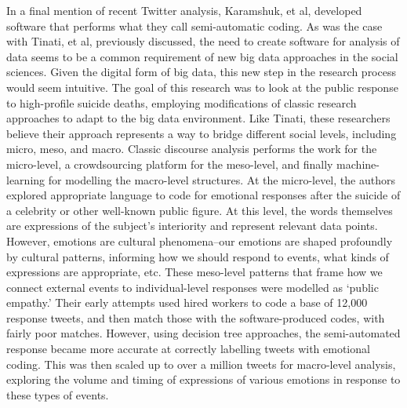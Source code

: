 \documentclass[sigconf]{acmart}
\begin{document}
In a final mention of recent Twitter analysis, Karamshuk, et al, developed software that performs what they call semi-automatic coding. \cite{karamshuk17} As was the case with Tinati, et al, previously discussed, the need to create software for analysis of data seems to be a common requirement of new big data approaches in the social sciences.  Given the digital form of big data, this new step in the research process would seem intuitive.  The goal of this research was to look at the public response to high-profile suicide deaths, employing modifications of classic research approaches to adapt to the big data environment.  Like Tinati, these researchers believe their approach represents a way to bridge different social levels, including micro, meso, and macro.  Classic discourse analysis performs the work for the micro-level, a crowdsourcing platform for the meso-level, and finally machine-learning for modelling the macro-level structures.  At the micro-level, the authors explored appropriate language to code for emotional responses after the suicide of a celebrity or other well-known public figure.  At this level, the words themselves are expressions of the subject's interiority and represent relevant data points.  However, emotions are cultural phenomena--our emotions are shaped profoundly by cultural patterns, informing how we should respond to events, what kinds of expressions are appropriate, etc.  These meso-level patterns that frame how we connect external events to individual-level responses were modelled as `public empathy.'  Their early attempts used hired workers to code a base of 12,000 response tweets, and then match those with the software-produced codes, with fairly poor matches.  However, using decision tree approaches, the semi-automated response became more accurate at correctly labelling tweets with emotional coding.  This was then scaled up to over a million tweets for macro-level analysis, exploring the volume and timing of expressions of various emotions in response to these types of events.  \cite{karamshuk17}
\end{document}

